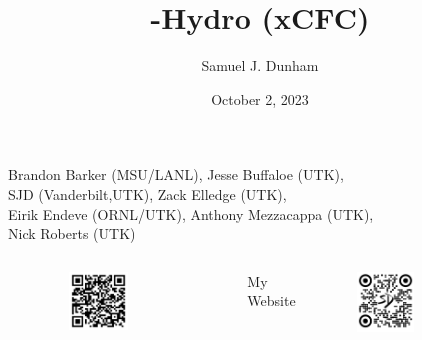 \documentclass{beamer}
\title[SXS NR Community Call]{\thornado-Hydro (xCFC)}
\author{Samuel J. Dunham}
\date{October 2, 2023}
\begin{document}
\begin{frame}

  \titlepage

  \vspace{-1em}

  \begin{center}
    Brandon Barker (MSU/LANL), %
    Jesse Buffaloe (UTK), \\
    SJD (Vanderbilt,UTK), %
    Zack Elledge (UTK), \\
    Eirik Endeve (ORNL/UTK), %
    Anthony Mezzacappa (UTK), \\
    Nick Roberts (UTK)
  \end{center}

  \vspace{-1em}

  \begin{columns}[c]

      \begin{center}\thornado\end{center}
      \vspace{-1.5em}
      \begin{figure}[htb!]
        \centering
        \includegraphics[width=0.5\textwidth]{fig.thornado.png}
      \end{figure}

      \begin{center}My Website\end{center}
      \vspace{-1.5em}
      \begin{figure}[htb!]
        \centering
        \includegraphics[width=0.5\textwidth]{fig.website.png}
      \end{figure}

  \end{columns}

\end{frame}
\end{document}
